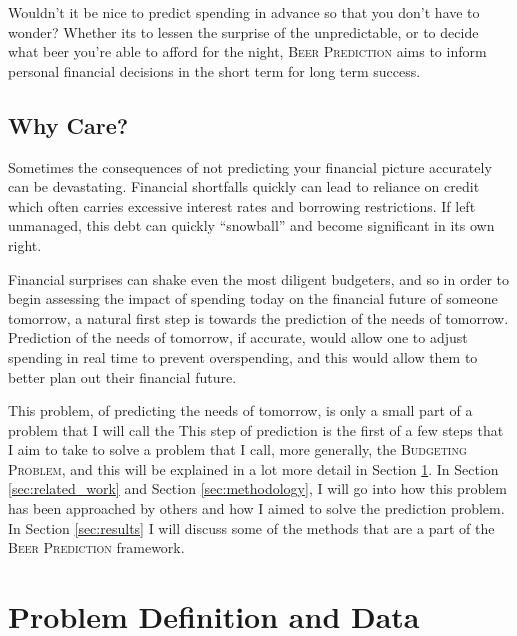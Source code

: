 \documentclass[11pt,a4paper]{article}
\newcommand{\beer}{\textsc{Beer Prediction}\xspace}
\begin{document}
Wouldn't it be nice to predict spending in advance so that you don't have to wonder? Whether its to lessen the surprise of the unpredictable, or to decide what beer you're able to afford for the night, \beer aims to inform personal financial decisions in the short term for long term success. 

\subsection{Why Care?}

\newcommand{\budgetprob}{\textsc{Budgeting Problem}\xspace}
\newcommand{\preprob}{\textsc{Prediction Problem}\xspace}

Sometimes the consequences of not predicting your financial picture accurately can be devastating. Financial shortfalls quickly can lead to reliance on credit which often carries excessive interest rates and borrowing restrictions. If left unmanaged, this debt can quickly ``snowball'' and become significant in its own right. 

Financial surprises can shake even the most diligent budgeters, and so in order to begin assessing the impact of spending today on the financial future of someone tomorrow, a natural first step is towards the prediction of the needs of tomorrow. Prediction of the needs of tomorrow, if accurate, would allow one to adjust spending in real time to prevent overspending, and this would allow them to better plan out their financial future. 

This problem, of predicting the needs of tomorrow, is only a small part of a problem that I will call the This step of prediction is the first of a few steps that I aim to take to solve a problem that I call, more generally, the \budgetprob, and this will be explained in a lot more detail in Section \ref{sec:problem}. In Section \ref{sec:related_work} and Section \ref{sec:methodology}, I will go into how this problem has been approached by others and how I aimed to solve the prediction problem. In Section \ref{sec:results} I will discuss some of the methods that are a part of the \beer framework. 

\section{Problem Definition and Data} \label{sec:problem}
\end{document}
